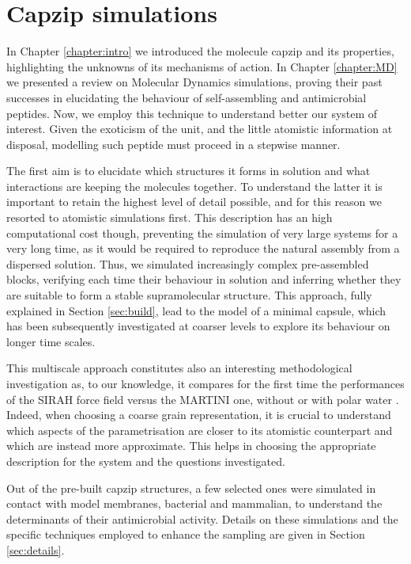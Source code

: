 \chapter{Capzip simulations} \label{chapter:capzip_results}

In Chapter \ref{chapter:intro} we introduced the molecule capzip and its properties, highlighting the unknowns of its mechanisms of action. In Chapter \ref{chapter:MD} we presented a review on Molecular Dynamics simulations, proving their past successes in elucidating the behaviour of self-assembling and antimicrobial peptides.
%
Now, we employ this technique to understand better our system of interest. Given the exoticism of the unit, and the little atomistic information at disposal, modelling such peptide must proceed in a stepwise manner.

The first aim is to elucidate which structures it forms in solution and what interactions are keeping the molecules together. To understand the latter it is important to retain the highest level of detail possible, and for this reason we resorted to atomistic simulations first.
%
This description has an high computational cost though, preventing the simulation of very large systems for a very long time, as it would be required to reproduce the natural assembly from a dispersed solution.
%
Thus, we simulated increasingly complex pre-assembled blocks, verifying each time their behaviour in solution and inferring whether they are suitable to form a stable supramolecular structure. This approach, fully explained in Section \ref{sec:build}, lead to the model of a minimal capsule, which has been subsequently investigated at coarser levels to explore its behaviour on longer time scales.

This multiscale approach constitutes also an interesting methodological investigation as, to our knowledge, it compares for the first time the performances of the SIRAH force field \cite{Machado2018} versus the MARTINI \citep{Marrink2007, Monticelli2008} one, without or with polar water \citep{Yesylevskyy2010}. Indeed, when choosing a coarse grain representation, it is crucial to understand which aspects of the parametrisation are closer to its atomistic counterpart and which are instead more approximate. This helps in choosing the appropriate description for the system and the questions investigated.

Out of the pre-built capzip structures, a few selected ones were simulated in contact with model membranes, bacterial and mammalian, to understand the determinants of their antimicrobial activity. Details on these simulations and the specific techniques employed to enhance the sampling are given in Section \ref{sec:details}.

